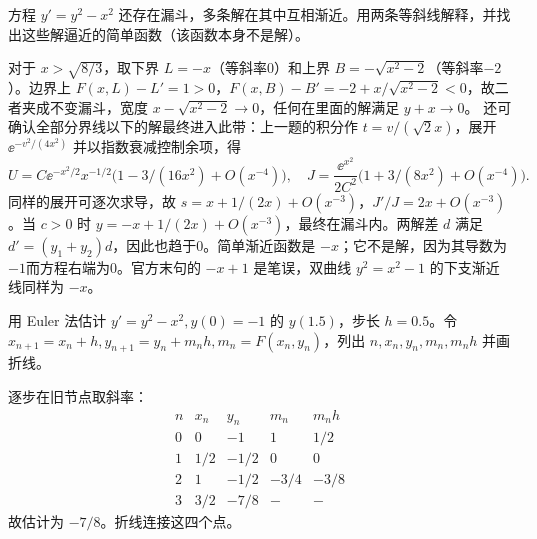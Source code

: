 \begin{exercise}\label{cw:rec02-8}
方程 $y'=y^2-x^2$ 还存在漏斗，多条解在其中互相渐近。用两条等斜线解释，并找出这些解逼近的简单函数（该函数本身不是解）。
\end{exercise}
\begin{solution}
对于 $x>\sqrt{8/3}$，取下界 $L=-x$（等斜率0）和上界 $B=-\sqrt{x^2-2}$（等斜率$-2$）。边界上 $F(x,L)-L'=1>0$，$F(x,B)-B'=-2+x/\sqrt{x^2-2}<0$，故二者夹成不变漏斗，宽度 $x-\sqrt{x^2-2}\to0$，任何在里面的解满足 $y+x\to0$。
还可确认全部分界线以下的解最终进入此带：上一题的积分作 $t=v/(\sqrt2x)$，展开 $\ee^{-v^2/(4x^2)}$ 并以指数衰减控制余项，得
\[
 U=C\ee^{-x^2/2}x^{-1/2}\bigl(1-3/(16x^2)+O(x^{-4})\bigr),\quad
 J=\frac{\ee^{x^2}}{2C^2}\bigl(1+3/(8x^2)+O(x^{-4})\bigr).
\]
同样的展开可逐次求导，故 $s=x+1/(2x)+O(x^{-3})$，$J'/J=2x+O(x^{-3})$。当 $c>0$ 时 $y=-x+1/(2x)+O(x^{-3})$，最终在漏斗内。两解差 $d$ 满足 $d'=(y_1+y_2)d$，因此也趋于0。简单渐近函数是 $-x$；它不是解，因为其导数为$-1$而方程右端为0。官方末句的 $-x+1$ 是笔误，双曲线 $y^2=x^2-1$ 的下支渐近线同样为 $-x$。
\par{}
\end{solution}

\begin{exercise}\label{cw:rec03-1}
用 Euler 法估计 $y'=y^2-x^2,y(0)=-1$ 的 $y(1.5)$，步长 $h=0.5$。令 $x_{n+1}=x_n+h,y_{n+1}=y_n+m_nh,m_n=F(x_n,y_n)$，列出 $n,x_n,y_n,m_n,m_nh$ 并画折线。
\end{exercise}
\begin{solution}
逐步在旧节点取斜率：
\[\begin{array}{c|rrrr}n&x_n&y_n&m_n&m_nh\\\hline0&0&-1&1&1/2\\1&1/2&-1/2&0&0\\2&1&-1/2&-3/4&-3/8\\3&3/2&-7/8&-&-\end{array}\]
故估计为 $-7/8$。折线连接这四个点。\begin{center}\end{center}
\par{}
\end{solution}

